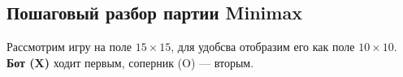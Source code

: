 \documentclass[a4paper,final]{article}
\begin{document}


\tableofcontents
\newpage








\subsection{Пошаговый разбор партии Minimax}

Рассмотрим игру на поле $15\times15$, для удобсва отобразим его как поле $10\times10$. \textbf{Бот (X)} ходит первым, соперник (O) --- вторым.










\end{document}
